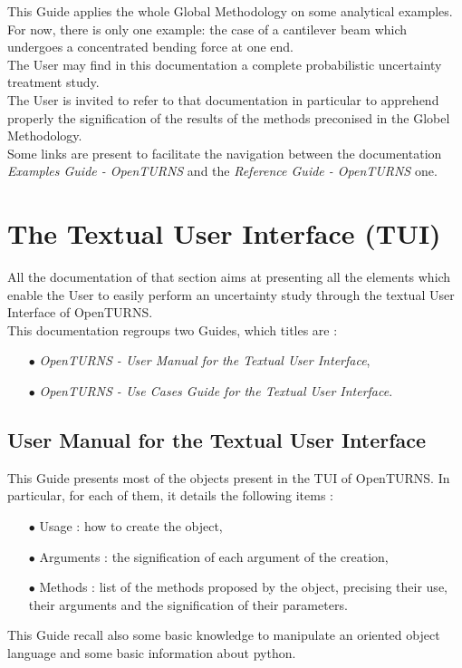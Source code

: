 \documentclass[11pt]{article}
\begin{document}
This Guide applies the whole Global Methodology on some analytical examples. For now, there is only one example: the case of a cantilever beam which undergoes a concentrated bending force at one end.\\

The User may find in this documentation a complete probabilistic uncertainty treatment study.\\

The User is invited to refer to that documentation in particular to apprehend properly the signification of the results of the methods preconised in the Globel Methodology.\\

Some links are present to facilitate the navigation between the documentation {\itshape Examples Guide - OpenTURNS} and the {\itshape Reference Guide - OpenTURNS} one.


\section{The Textual User Interface (TUI)}

All the documentation of that section aims at presenting all the elements which enable the User to easily perform an uncertainty study through the textual User Interface of OpenTURNS. \\

This documentation regroups two Guides, which titles are :
\begin{itemize}
\item[$\bullet$] {\itshape OpenTURNS - User Manual for the Textual User Interface},
\item[$\bullet$] {\itshape OpenTURNS - Use Cases Guide for the Textual User Interface}.
\end{itemize}


\subsection{User Manual for the Textual User Interface}

This Guide presents most of the objects present in the TUI of OpenTURNS. In particular, for each of them, it details  the following items :
\begin{itemize}
\item[$\bullet$] Usage : how to create the object,
\item[$\bullet$] Arguments : the signification of each argument of the creation,
\item[$\bullet$] Methods : list of the methods proposed by the object, precising their use, their arguments and the signification of their parameters.
\end{itemize}
\vspace{0.5cm}
This Guide recall also some basic knowledge to manipulate an oriented object language and some basic information about python.\\
\end{document}
